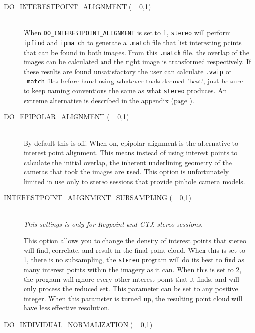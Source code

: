 \begin{description}
\item[DO\_INTERESTPOINT\_ALIGNMENT \textnormal{\small{(= 0,1)}}] \hfill \\

  When \texttt{DO\_INTERESTPOINT\_ALIGNMENT} is set to 1,
  \texttt{stereo} will perform \texttt{ipfind} and \texttt{ipmatch} to
  generate a \texttt{.match} file that list interesting points that
  can be found in both images. From this \texttt{.match} file, the
  overlap of the images can be calculated and the right image is
  transformed respectively. If these results are found unsatisfactory
  the user can calculate \texttt{.vwip} or \texttt{.match} files
  before hand using whatever tools deemed 'best', just be sure to keep
  naming conventions the same as what \texttt{stereo} produces. An
  extreme alternative is described in the appendix (page
  \pageref{appendix_surf}).

\item[DO\_EPIPOLAR\_ALIGNMENT \textnormal{\small{(= 0,1)}}] \hfill \\

  By default this is off.  When on, epipolar alignment is the
  alternative to interest point alignment. This means instead of using
  interest points to calculate the initial overlap, the inherent
  underlining geometry of the cameras that took the images are
  used. This option is unfortunately limited in use only to stereo
  sessions that provide pinhole camera models.

\item[INTERESTPOINT\_ALIGNMENT\_SUBSAMPLING \textnormal{\small{(= 0,1)}}] \hfill \\

  \emph{This settings is only for Keypoint and CTX stereo sessions.}

  This option allows you to change the density of interest points that
  stereo will find, correlate, and result in the final point cloud.
  When this is set to 1, there is no subsampling, the \texttt{stereo}
  program will do its best to find as many interest points within the
  imagery as it can.  When this is set to 2, the program will ignore
  every other interest point that it finds, and will only process the
  reduced set.  This parameter can be set to any positive integer.
  When this parameter is turned up, the resulting point cloud will
  have less effective resolution.

\item[DO\_INDIVIDUAL\_NORMALIZATION \textnormal{\small{(= 0,1)}}] \hfill \\


\end{description}
